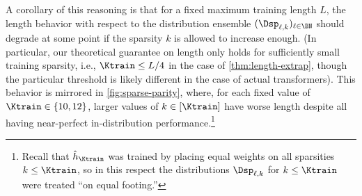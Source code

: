 \documentclass{article}
\newcommand{\icml}[1]{\iftoggle{icml}{#1}{}}
\begin{document}
A corollary of this reasoning is that for a fixed maximum training length $L$, the length \generalization behavior with respect to the distribution ensemble $(\Dsp_{\ell,k})_{\ell \in \BN}$ should degrade at some point if the sparsity $k$ is allowed to increase enough. 
(In particular, our theoretical guarantee on length \generalization only holds for sufficiently small training sparsity, i.e., $\Ktrain \leq L/4$ in the case of \cref{thm:length-extrap}, though the particular threshold is likely different in the case of actual transformers). This behavior is mirrored in \cref{fig:sparse-parity}\icml{ as well as \cref{fig:sparse-parity-extra} in \cref{sec:sparse-parity-extra-results}}, where, for each fixed value of $\Ktrain \in \{10,12\}$, larger values of $k \in [\Ktrain]$ have worse length \generalization despite all having near-perfect in-distribution performance.\footnote{Recall that $\hat h_{\Ktrain}$ was trained by placing equal weights on all sparsities $k \leq \Ktrain$, so in this respect the distributions $\Dsp_{\ell,k}$ for $k \leq \Ktrain$ were treated ``on equal footing.''}

\icml{
  \begin{figure*}[t]
    \centering
    \begin{subfigure}[b]{0.3\textwidth}
      \centering
\texttt{[image: plots/output\_dir.model\_sparse\_parity-0-0.5\_ngram10vtrain\_FINALlgplots.pdf]}   
      \caption{Sparse parity}
      \label{fig:sparse-parity}
    \end{subfigure}
  \begin{subfigure}[b]{0.3\textwidth}
    \centering
    \texttt{[image: plots/output\_dir.model\_parity\_cot-0-\_-0.5\_\_trial\_v2\_position\_options-poscoupling-210FINALlgplots.pdf]}
    \caption{Parity with scratchpad \& \PPC}
    \label{fig:parity-cot}
  \end{subfigure}
\begin{subfigure}[b]{0.3\textwidth}
    \centering
    \texttt{[image: plots/output\_dir.model\_mon\_pointer\_chasing\_cot\_posemb\_trial\_v\_position\_options-poscoupling-230FINALlgplots.pdf]}
    \caption{Variable asst.~with scratchpad \& \PPC}
    \label{fig:pointer-cot}
  \end{subfigure}
  \caption{Length generalization for experiments in \cref{sec:sparse-parity,sec:cot-pc}. Shaded areas in {(b), (c)} represent $95\%$ CIs over multiple training runs.}
  \label{fig:icml-synthetic-main}
  \end{figure*}
}
\end{document}
